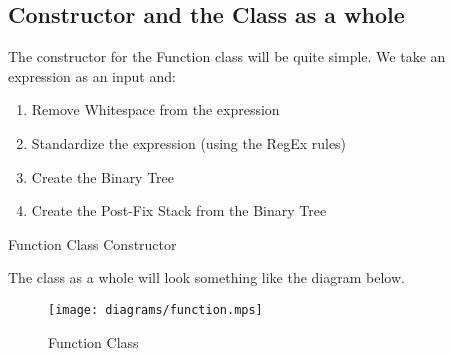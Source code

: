 \documentclass[../../../../../main.tex]{subfiles}
\begin{document}
\subsection{Constructor and the Class as a whole}
The constructor for the Function class will be quite simple. We take an expression as an input and:
\begin{enumerate}
	\item Remove Whitespace from the expression
	\item Standardize the expression (using the RegEx rules)
	\item Create the Binary Tree
	\item Create the Post-Fix Stack from the Binary Tree
\end{enumerate}
\begin{algorithm}
\DontPrintSemicolon
\caption{Function Class Constructor}
\end{algorithm}
The class as a whole will look something like the diagram below.
\begin{figure}[H]
	\centering
	\texttt{[image: diagrams/function.mps]}
	\caption{Function Class}
\end{figure}
\newpage
\end{document}
